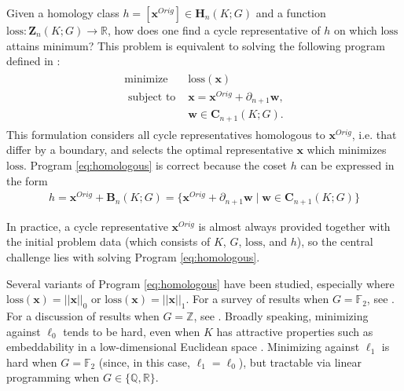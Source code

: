 \documentclass[utf8]{formatting_stuff/frontiersFPHY}
\newcommand{\R}{\mathbb{R}}
\newcommand{\Z}{\mathbb{Z}}
\newcommand{\Q}{\mathbb{Q}}
\newcommand{\field}{\mathbb{F}}
\newcommand{\Chains}{\mathbf{C}}
\newcommand{\Homologies}[0]{\mathbf{H}}
\newcommand{\Boundaries}[0]{\mathbf{B}}
\newcommand{\Cycles}[0]{\mathbf{Z}}
\newcommand{\originalrep}{\mathbf{x}^{Orig}}
\newcommand{\optimalrep}{\mathbf{x}}
\newcommand{\boundingchain}{\mathbf{w}}
\newcommand{\hclass}{h}
\newcommand{\loss}{\mathrm{loss}}
\newcommand{\pr}{Program }
\theoremstyle{plain}
\theoremstyle{definition}
\begin{document}
Given a homology class $\hclass =[\originalrep] \in \Homologies_n(K; G)$ and a function $\loss: \Cycles_n(K;G) \to \R$, how does one find a cycle representative of $\hclass$ on which $\loss$ attains minimum?  This problem is equivalent to  solving the following program defined in \cite{dey2011optimal}:
\begin{align}
   \begin{split}
    \text{minimize } & \loss(\optimalrep) \\
    \text{ subject to } & \optimalrep = \originalrep + \partial_{n+1} \boundingchain, \\
    & \boundingchain \in \Chains_{n+1}(K; G).
   \end{split}
   \label{eq:homologous}
\end{align}
This formulation considers all cycle representatives homologous to $\originalrep$, i.e. that differ by a boundary, and selects the optimal representative $\optimalrep$ which minimizes $\loss$.
\pr \eqref{eq:homologous} is correct because the coset $\hclass$ can be expressed in the form
    \begin{align*}
    \hclass
    =
    \originalrep + \Boundaries_n(K; G) 
    =
    \{ \originalrep + \partial_{n+1} \boundingchain \mid \boundingchain \in \Chains_{n+1}(K; G) \}
    \end{align*}  

In practice, a cycle representative $\originalrep$ is almost always provided together with the initial problem data (which consists of $K$, $G$, $\loss$, and $\hclass$), so the central challenge lies with solving \pr \eqref{eq:homologous}.



Several variants of \pr \eqref{eq:homologous} have been studied, especially where $\loss(\optimalrep) = ||\optimalrep||_0$ or $\loss(\optimalrep) = ||\optimalrep||_1$.  For a survey of results when $G = \field_2$, see \cite{chenhardness}.  For a discussion of results when $G = \Z$, see \cite{dey2011optimal}.  Broadly  speaking, minimizing against $\ell_0$  tends to be hard, even when $K$ has attractive properties such as embeddability in a low-dimensional Euclidean space \cite{borradaile2020minimum}.  Minimizing against $\ell_1$  is hard when $G = \field_2$ (since, in this case, $\ell_1 = \ell_0$),  but tractable via linear programming when $G \in \{\Q, \R\}$.  
\end{document}
